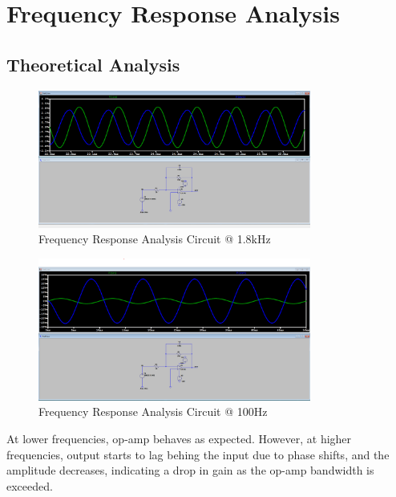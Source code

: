 \newpage{}
\thispagestyle{plain}

\section{Frequency Response Analysis}

\subsection{Theoretical Analysis}

\begin{figure}[h]
    \centering
    \includegraphics[width=0.8\textwidth]{assets/p2-1.8k.png}
    \caption{Frequency Response Analysis Circuit @ 1.8kHz}
    \label{fig:frequency-response-analysis-circuit-1.8k}
\end{figure}

\begin{figure}[h]
    \centering
    \includegraphics[width=0.8\textwidth]{assets/p2-100.png}
    \caption{Frequency Response Analysis Circuit @ 100Hz}
    \label{fig:frequency-response-analysis-circuit-100}
\end{figure}

At lower frequencies, op-amp behaves as expected. However, at higher frequencies, output starts to lag behing the input due to phase shifts, and the amplitude decreases, indicating a drop in gain as the op-amp bandwidth is exceeded.

